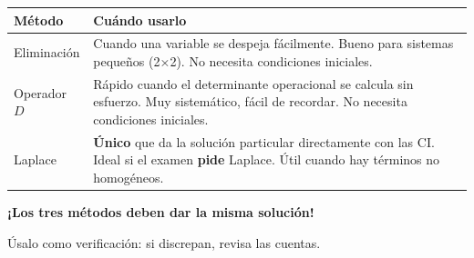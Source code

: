 \documentclass[9pt,a4paper]{article}
\begin{document}
\begin{tabular}{p{3cm} p{10cm}}
\textbf{Método} & \textbf{Cuándo usarlo} \\ \hline
Eliminación     & Cuando una variable se despeja fácilmente. Bueno para sistemas pequeños (2×2). No necesita condiciones iniciales. \\
Operador \(D\)  & Rápido cuando el determinante operacional se calcula sin esfuerzo. Muy sistemático, fácil de recordar. No necesita condiciones iniciales. \\
Laplace         & \textbf{Único} que da la solución particular directamente con las CI. Ideal si el examen \textbf{pide} Laplace. Útil cuando hay términos no homogéneos.
\end{tabular}

\medskip
\centerline{\textbf{¡Los tres métodos deben dar la misma solución!}}
\centerline{Úsalo como verificación: si discrepan, revisa las cuentas.}
\end{document}
